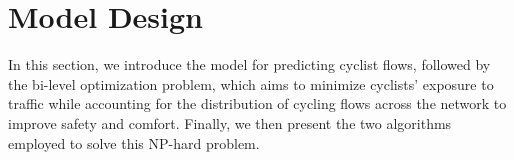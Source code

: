 \documentclass[letterpaper, 10 pt, conference]{ieeeconf}  %
\newcommand{\largepurplecircle}{\textcolor{blue}{\scalebox{1.5}{$\bullet$}}}
\begin{document}
\section{Model Design}
\label{model_design}
In this section, we introduce the model for predicting cyclist flows, followed by the bi-level optimization problem, which aims to minimize cyclists' exposure to traffic while accounting for the distribution of cycling flows across the network to improve safety and comfort.  Finally, we then present the two algorithms employed to solve this NP-hard problem. 



\end{document}
